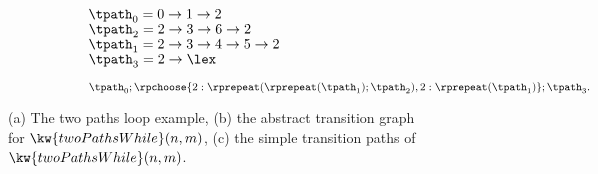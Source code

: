 {\begin{figure}
\begin{subfigure}{.71\textwidth}
\begin{subfigure}{.67\textwidth}
\begin{centering}
        \caption{}
\end{centering}
\end{subfigure}
{\small
\begin{subfigure}{.3\textwidth}
\begin{centering}
        $\tpath_0 = 0 \to 1 \to 2$ \\
        $\tpath_2 = 2 \to 3 \to 6 \to 2$ \\ 
        $\tpath_1 = 2 \to 3 \to 4 \to 5 \to 2$ \\
        $\tpath_3 = 2 \to \lex$
        \caption{}
\end{centering}
\end{subfigure}
}
{\small
\begin{subfigure}{.8\textwidth}
\begin{centering}
    $
    \tpath_0 ; 
    \rpchoose{2: \rprepeat(\rprepeat(\tpath_1); \tpath_2), 
    2: \rprepeat(\tpath_1)}; \tpath_3.
    $
\end{centering}
\end{subfigure}
}
\end{subfigure}
\caption{
    (a) The two paths loop example,
    (b) the abstract transition graph for $\kw{twoPathsWhile}(n, m)$,
    (c) the simple transition paths of $\kw{twoPathsWhile}(n, m)$.}
        \label{fig:whileTwoCounters-overview}
    \end{figure}
    }


